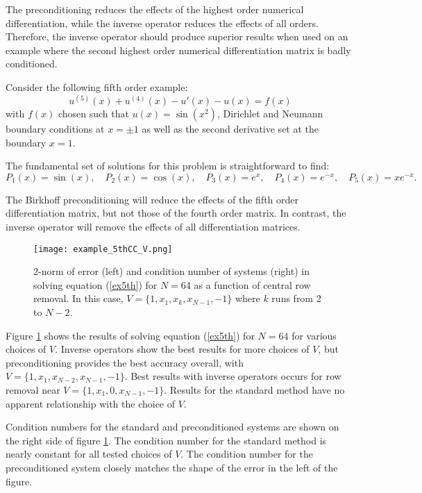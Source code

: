 \documentclass{sfuthesis}
\begin{document}
The preconditioning reduces the effects of the highest order numerical differentiation, while the inverse operator reduces the effects of all orders.
Therefore, the inverse operator should produce superior results when used on an example where the second highest order numerical differentiation matrix is badly conditioned.

Consider the following fifth order example:
\begin{equation} \label{ex5th}
u^{(5)}(x) + u^{(4)}(x) - u'(x) - u(x) = f(x)
\end{equation}
with $f(x)$ chosen such that $u(x) = \sin(x^2)$, Dirichlet and Neumann boundary conditions at $x=\pm 1$ as well as the second derivative set at the boundary $x = 1$.

The fundamental set of solutions for this problem is straightforward to find:
\begin{equation}
P_1(x) = \sin(x), \quad P_2(x) =\cos(x), \quad P_3(x) = e^x, \quad P_4(x) = e^{-x}, \quad P_5(x) = x e^{-x}.
\end{equation}

The Birkhoff preconditioning will reduce the effects of the fifth order differentiation matrix, but not those of the fourth order matrix.
In contrast, the inverse operator will remove the effects of all differentiation matrices.

\begin{figure}
\texttt{[image: example\_5thCC\_V.png]}
\caption{2-norm of error (left) and condition number of systems (right) in solving equation (\ref{ex5th}) for $N = 64$ as a function of central row removal. In this case, $V = \{ 1, x_1, x_k, x_{N-1}, -1 \}$ where $k$ runs from 2 to $N-2$.}
\label{fig:ex5thCC V}
\end{figure}

Figure \ref{fig:ex5thCC V} shows the results of solving equation (\ref{ex5th}) for $N = 64$ for various choices of $V$.
Inverse operators show the best results for more choices of $V$, but preconditioning provides the best accuracy overall, with $V = \{1, x_1, x_{N-2}, x_{N-1}, -1\}$.
Best results with inverse operators occurs for row removal near $V = \{1, x_1, 0, x_{N-1}, -1\}$.
Results for the standard method have no apparent relationship with the choice of $V$.

Condition numbers for the standard and preconditioned systems are shown on the right side of figure \ref{fig:ex5thCC V}.
The condition number for the standard method is nearly constant for all tested choices of $V$.
The condition number for the preconditioned system closely matches the shape of the error in the left of the figure.
\end{document}
